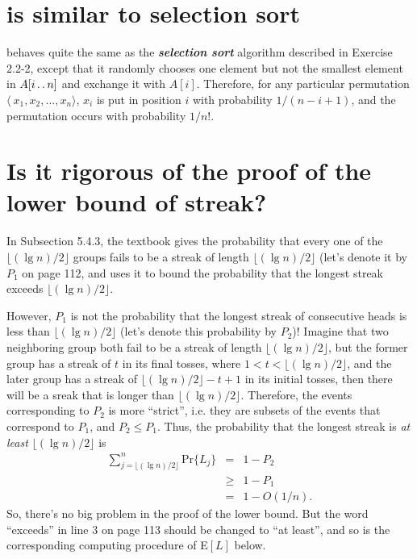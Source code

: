 \documentclass[a4paper, fleqn]{article}
\begin{document}
\section{ is similar to selection sort}

 behaves quite the same as the \textbf{\textit{selection 
sort}} algorithm described in Exercise 2.2-2, except that it randomly chooses one 
element but not the smallest element in $A[i \mathinner{\ldotp\ldotp} n]$ and exchange it with 
$A[i]$. Therefore, for any particular permutation $\langle\ x_1, x_2, \ldots, x_n 
\rangle$, $x_i$ is put in position $i$ with probability $1 / (n - i + 1)$, and 
the permutation occurs with probability $1/n!$.


\section{Is it rigorous of the proof of the lower bound of streak?}

In Subsection 5.4.3, the textbook gives the probability that every one of the 
$\lfloor (\lg n) / 2 \rfloor$ groups fails to be a streak of length $\lfloor 
(\lg n) / 2 \rfloor$ (let's denote it by $P_1$ on page 112, and uses it to bound 
the probability that the longest streak exceeds $\lfloor (\lg n) / 2 \rfloor$.

However, $P_1$ is not the probability that the longest streak of consecutive 
heads is less than $\lfloor (\lg n) / 2 \rfloor$ (let's denote this probability 
by $P_2$)! Imagine that two neighboring group both fail to be a streak of length 
$\lfloor (\lg n) / 2 \rfloor$, but the former group has a streak of $t$ in its 
final tosses, where $1 < t < \lfloor (\lg n) / 2 \rfloor$, and the later group 
has a streak of $\lfloor (\lg n) / 2 \rfloor - t + 1$ in its initial tosses, 
then there will be a sreak that is longer than $\lfloor (\lg n) / 2 \rfloor$. 
Therefore, the events corresponding to $P_2$ is more ``strict'', i.e. they are 
subsets of the events that correspond to $P_1$, and $P_2 \leq P_1$. Thus, the 
probability that the longest streak is \textit{at least} $\lfloor (\lg n) / 2 
\rfloor$ is
\begin{eqnarray*}
\sum_{j = \lfloor (\lg n) / 2 \rfloor}^n \mbox{Pr}\{L_j\} & = & 1 - P_2 \\
& \geq & 1 - P_1 \\
& = & 1 - O(1/n).
\end{eqnarray*}
So, there's no big problem in the proof of the lower bound. But the word 
``exceeds'' in line 3 on page 113 should be changed to ``at least'', and so is 
the corresponding computing procedure of E$[L]$ below.
\end{document}
